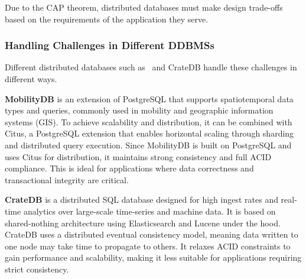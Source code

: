 Due to the CAP theorem, distributed databases must make design trade-offs based on the requirements of the application they serve.

\subsubsection{Handling Challenges in Different DDBMSs}
Different distributed databases such as \mobilitydbc~and CrateDB handle these challenges in different ways.

\textbf{MobilityDB} is an extension of PostgreSQL that supports spatiotemporal data types and queries, commonly used in mobility and geographic information systems (GIS).
To achieve scalability and distribution, it can be combined with Citus, a PostgreSQL extension that enables horizontal scaling through sharding and distributed query execution.
Since MobilityDB is built on PostgreSQL and uses Citus for distribution, it maintains strong consistency and full ACID compliance.
This is ideal for applications where data correctness and transactional integrity are critical.

\textbf{CrateDB} is a distributed SQL database designed for high ingest rates and real-time analytics over large-scale time-series and machine data.
It is based on shared-nothing architecture using Elasticsearch and Lucene under the hood.
CrateDB uses a distributed eventual consistency model, meaning data written to one node may take time to propagate to others.
It relaxes ACID constraints to gain performance and scalability, making it less suitable for applications requiring strict consistency.

